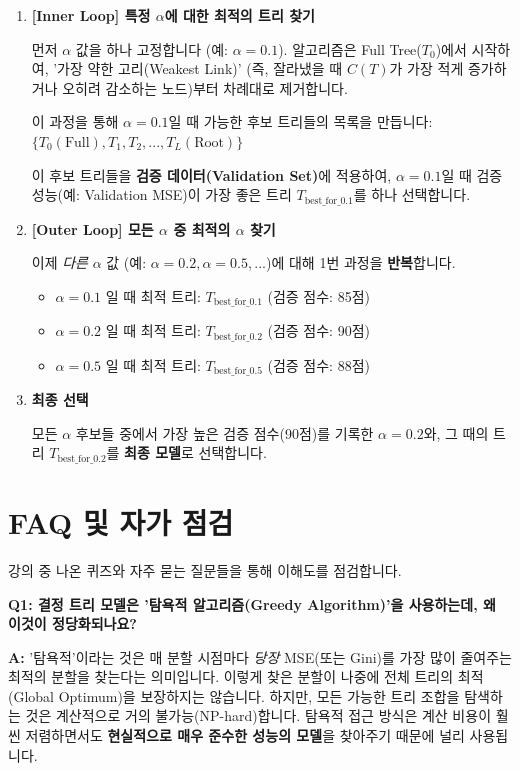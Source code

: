 \documentclass[11pt,a4paper]{book}
\theoremstyle{definition}
\begin{document}
\begin{enumerate}
    \item \textbf{[Inner Loop] 특정 $\alpha$에 대한 최적의 트리 찾기}
    
    먼저 $\alpha$ 값을 하나 고정합니다 (예: $\alpha=0.1$).
    알고리즘은 Full Tree($T_0$)에서 시작하여, '가장 약한 고리(Weakest Link)' (즉, 잘라냈을 때 $C(T)$가 가장 적게 증가하거나 오히려 감소하는 노드)부터 차례대로 제거합니다.
    
    이 과정을 통해 $\alpha=0.1$일 때 가능한 후보 트리들의 목록을 만듭니다:
    $\{ T_0(\text{Full}), T_1, T_2, ..., T_L(\text{Root}) \}$
    
    이 후보 트리들을 \textbf{검증 데이터(Validation Set)}에 적용하여, $\alpha=0.1$일 때 검증 성능(예: Validation MSE)이 가장 좋은 트리 $T_{\text{best\_for\_0.1}}$를 하나 선택합니다.

    \item \textbf{[Outer Loop] 모든 $\alpha$ 중 최적의 $\alpha$ 찾기}
    
    이제 \textit{다른} $\alpha$ 값 (예: $\alpha=0.2, \alpha=0.5, ...$)에 대해 1번 과정을 \textbf{반복}합니다.
    
    \begin{itemize}
        \item $\alpha=0.1$ 일 때 최적 트리: $T_{\text{best\_for\_0.1}}$ (검증 점수: 85점)
        \item $\alpha=0.2$ 일 때 최적 트리: $T_{\text{best\_for\_0.2}}$ (검증 점수: 90점)
        \item $\alpha=0.5$ 일 때 최적 트리: $T_{\text{best\_for\_0.5}}$ (검증 점수: 88점)
    \end{itemize}

    \item \textbf{최종 선택}
    
    모든 $\alpha$ 후보들 중에서 가장 높은 검증 점수(90점)를 기록한 $\alpha=0.2$와, 그 때의 트리 $T_{\text{best\_for\_0.2}}$를 \textbf{최종 모델}로 선택합니다.
\end{enumerate}


\section{FAQ 및 자가 점검}

강의 중 나온 퀴즈와 자주 묻는 질문들을 통해 이해도를 점검합니다.

\begin{boxExample}
    \textbf{Q1: 결정 트리 모델은 '탐욕적 알고리즘(Greedy Algorithm)'을 사용하는데, 왜 이것이 정당화되나요?}
    
    \textbf{A:} '탐욕적'이라는 것은 매 분할 시점마다 \textit{당장} MSE(또는 Gini)를 가장 많이 줄여주는 최적의 분할을 찾는다는 의미입니다. 이렇게 찾은 분할이 나중에 전체 트리의 최적(Global Optimum)을 보장하지는 않습니다.
    하지만, 모든 가능한 트리 조합을 탐색하는 것은 계산적으로 거의 불가능(NP-hard)합니다. 탐욕적 접근 방식은 계산 비용이 훨씬 저렴하면서도 \textbf{현실적으로 매우 준수한 성능의 모델}을 찾아주기 때문에 널리 사용됩니다.
\end{boxExample}
\end{document}
